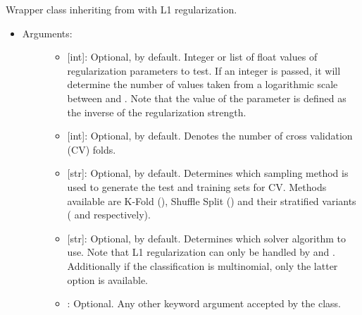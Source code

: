 \documentclass[letterpaper,10pt,english]{sphinxmanual}
\begin{document}
\begin{fulllineitems}
\label{\detokenize{models:data_tools.models.Lasso}}
Wrapper class inheriting from
 with L1
regularization.
\begin{itemize}
\item {} \begin{description}
\item[{Arguments:}] \leavevmode\begin{itemize}
\item {} 
 {[}int{]}: Optional,  by default. Integer or list of
float values of regularization parameters to test. If an
integer is passed, it will determine the number of values
taken from a logarithmic scale between  and .
Note that the value of the parameter is defined as the inverse
of the regularization strength.

\item {} 
 {[}int{]}: Optional,  by default. Denotes the number of
cross validation (CV) folds.

\item {} 
 {[}str{]}: Optional,  by default. Determines
which sampling method is used to generate the test and
training sets for CV. Methods available are K-Fold (),
Shuffle Split () and their stratified variants
( and  respectively).

\item {} 
 {[}str{]}: Optional,  by default.
Determines which solver algorithm to use. Note that L1
regularization can only be handled by  and
. Additionally if the classification is multinomial,
only the latter option is available.

\item {} 
: Optional. Any other keyword argument accepted by
the  class.


\end{itemize}
\end{description}
\end{itemize}
\end{fulllineitems}
\end{document}
